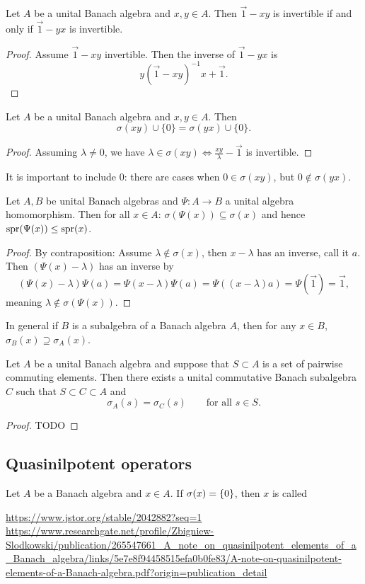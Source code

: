 \begin{proposition}
Let $A$ be a unital Banach algebra and $x,y\in A$. Then $\vec{1} - xy$ is invertible \textup{if and only if} $\vec{1} - yx$ is invertible.
\end{proposition}
\begin{proof}
Assume $\vec{1} - xy$ invertible. Then the inverse of $\vec{1} - yx$ is
\[ y(\vec{1} - xy)^{-1}x + \vec{1}. \]
\end{proof}
\begin{corollary}
Let $A$ be a unital Banach algebra and $x,y\in A$. Then
\[ \sigma(xy)\cup\{0\} = \sigma(yx)\cup\{0\}. \]
\end{corollary}
\begin{proof}
Assuming $\lambda \neq 0$, we have $\lambda\in\sigma(xy) \iff \frac{xy}{\lambda} - \vec{1}$ is invertible.
\end{proof}
It is important to include $0$: there are cases when $0\in \sigma(xy)$, but $0\notin \sigma(yx)$.

\begin{lemma} \label{spectrumOfImage}
Let $A,B$ be unital Banach algebras and $\Psi: A\to B$ a unital algebra homomorphism. Then for all $x\in A$: $\sigma(\Psi(x)) \subseteq \sigma(x)$ and hence $\operatorname{spr}(\Psi(x)) \leq \operatorname{spr}(x)$.
\end{lemma}
\begin{proof}
By contraposition: Assume $\lambda\notin\sigma(x)$, then $x-\lambda$ has an inverse, call it $a$. Then $(\Psi(x) - \lambda)$ has an inverse by
\[ (\Psi(x) - \lambda)\Psi(a) = \Psi(x-\lambda)\Psi(a) = \Psi((x-\lambda)a) = \Psi(\vec{1}) = \vec{1},\]
meaning $\lambda \notin \sigma(\Psi(x))$.
\end{proof}

In general if $B$ is a subalgebra of a Banach algebra $A$, then for any $x\in B$, $\sigma_B(x) \supseteq \sigma_A(x)$.

\begin{proposition}
Let $A$ be a unital Banach algebra and suppose that $S\subset A$ is a set of pairwise commuting elements. Then there exists a unital commutative Banach subalgebra $C$ such that $S\subset C\subset A$ and
\[ \sigma_A(s) = \sigma_C(s) \qquad \text{for all $s\in S$.} \]
\end{proposition}
\begin{proof}
TODO
\end{proof}

\subsection{Quasinilpotent operators}
\begin{definition}
Let $A$ be a Banach algebra and $x\in A$. If $\sigma(x) = \{0\}$, then $x$ is called 
\end{definition}
\url{https://www.jstor.org/stable/2042882?seq=1}
\url{https://www.researchgate.net/profile/Zbigniew-Slodkowski/publication/265547661_A_note_on_quasinilpotent_elements_of_a_Banach_algebra/links/5e7e8f94458515efa0b0fe83/A-note-on-quasinilpotent-elements-of-a-Banach-algebra.pdf?origin=publication_detail}

